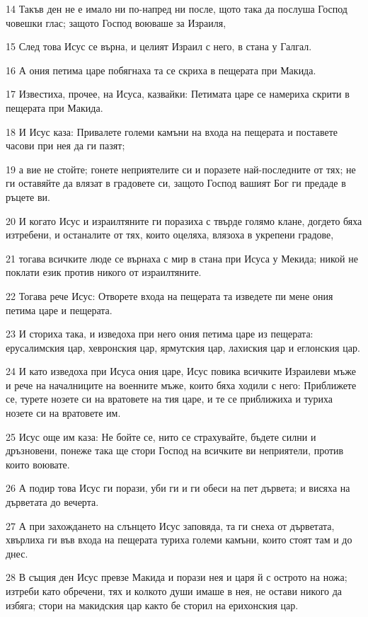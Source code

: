 \par 14 Такъв ден не е имало ни по-напред ни после, щото така да послуша Господ човешки глас; защото Господ воюваше за Израиля,
\par 15 След това Исус се върна, и целият Израил с него, в стана у Галгал.
\par 16 А ония петима царе побягнаха та се скриха в пещерата при Макида.
\par 17 Известиха, прочее, на Исуса, казвайки: Петимата царе се намериха скрити в пещерата при Макида.
\par 18 И Исус каза: Привалете големи камъни на входа на пещерата и поставете часови при нея да ги пазят;
\par 19 а вие не стойте; гонете неприятелите си и поразете най-последните от тях; не ги оставяйте да влязат в градовете си, защото Господ вашият Бог ги предаде в ръцете ви.
\par 20 И когато Исус и израилтяните ги поразиха с твърде голямо клане, догдето бяха изтребени, и останалите от тях, които оцеляха, влязоха в укрепени градове,
\par 21 тогава всичките люде се върнаха с мир в стана при Исуса у Мекида; никой не поклати език против никого от израилтяните.
\par 22 Тогава рече Исус: Отворете входа на пещерата та изведете пи мене ония петима царе и пещерата.
\par 23 И сториха така, и изведоха при него ония петима царе из пещерата: ерусалимския цар, хевронския цар, ярмутския цар, лахиския цар и еглонския цар.
\par 24 И като изведоха при Исуса ония царе, Исус повика всичките Израилеви мъже и рече на началниците на военните мъже, които бяха ходили с него: Приближете се, турете нозете си на вратовете на тия царе, и те се приближиха и туриха нозете си на вратовете им.
\par 25 Исус още им каза: Не бойте се, нито се страхувайте, бъдете силни и дръзновени, понеже така ще стори Господ на всичките ви неприятели, против които воювате.
\par 26 А подир това Исус ги порази, уби ги и ги обеси на пет дървета; и висяха на дърветата до вечерта.
\par 27 А при захождането на слънцето Исус заповяда, та ги снеха от дърветата, хвърлиха ги във входа на пещерата туриха големи камъни, които стоят там и до днес.
\par 28 В същия ден Исус превзе Макида и порази нея и царя й с острото на ножа; изтреби като обречени, тях и колкото души имаше в нея, не остави никого да избяга; стори на макидския цар както бе сторил на ерихонския цар.
